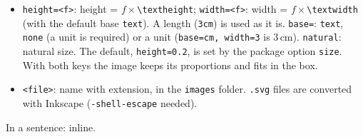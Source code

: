 \documentclass[sectioning=nobreak]{myreport}
\begin{document}

\begin{demosyntax}
\end{demosyntax}
\begin{itemize}
  \item \texttt{height=<f>}: height = $f\times$\verb|\textheight|;
        \texttt{width=<f>}: width = $f\times$\verb|\textwidth| (with
        the default base \texttt{text}). A length (\texttt{3cm}) is used
        as it is. \texttt{base=}: \texttt{text}, \texttt{none} (a unit
        is required) or a unit (\texttt{base=cm, width=3} is 3\,cm).
        \texttt{natural}: natural size. The default,
        \texttt{height=0.2}, is set by the package option \texttt{size}.
        With both keys the image keeps its proportions and fits in the
        box.
  \item \texttt{<file>}: name with extension, in the \texttt{images}
        folder. \texttt{.svg} files are converted with Inkscape
        (\texttt{-shell-escape} needed).
\end{itemize}

\begin{demo}
\end{demo}
\begin{demo}
\hfill{}
\end{demo}
\begin{demo}
\hfill {}   %
\hfill {}          %
\end{demo}
\begin{demo}
In a sentence:  inline.
\end{demo}
\begin{demo}
\end{demo}
\end{document}

